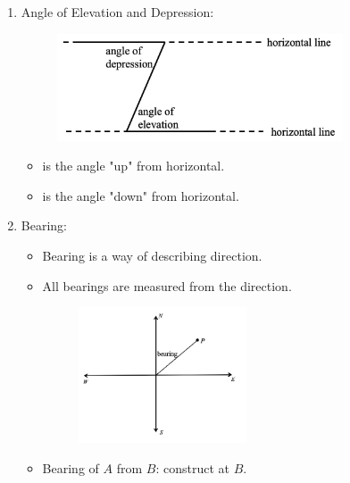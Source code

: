 \documentclass[12pt, a4paper]{article}
\begin{document}
\begin{enumerate}
  \item Angle of Elevation and Depression: 
  \begin{myclaim}{ }{}
    \begin{figure}[H]
      \centering
      \includegraphics[width=0.8\textwidth]{Fig.20.jpg}
    \end{figure}
    \begin{itemize}
    \item \textbf{\color{red}{Angle of Elevation}} is the angle "up" from horizontal. 
    \item \textbf{\color{red}{Angle of Depression}} is the angle "down" from horizontal. 
    \end{itemize}
  \end{myclaim}
  \item Bearing: 
  \begin{itemize}
    \item Bearing is a way of describing direction. 
    \item All bearings are measured {\color{red}{clockwise}} from the {\color{red}{North}} direction. 
    \begin{figure}[H]
      \centering
      \includegraphics[width=0.5\textwidth]{Fig.21.jpg}
    \end{figure}
  \item Bearing of $A$ from $B$: construct at $B$.\\
  {\color{green}{N.B.: Bearing of $A$ from $B$ is different from bearing of $B$ from $A$.}}
  \end{itemize}
\end{enumerate}
\end{document}
